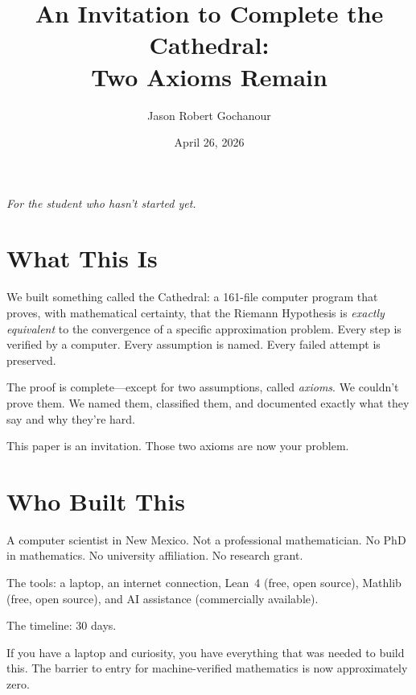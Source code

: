 \documentclass[11pt,a4paper]{article}
\title{%
  An Invitation to Complete the Cathedral:\\
  Two Axioms Remain%
}
\author{
  Jason Robert Gochanour
}
\date{April 26, 2026}
\begin{document}
\maketitle

\begin{center}
\emph{For the student who hasn't started yet.}
\end{center}

\vspace{1cm}

\section*{What This Is}

We built something called the Cathedral: a 161-file computer program
that proves, with mathematical certainty, that the Riemann Hypothesis
is \emph{exactly equivalent} to the convergence of a specific
approximation problem. Every step is verified by a computer. Every
assumption is named. Every failed attempt is preserved.

The proof is complete---except for two assumptions, called
\emph{axioms}. We couldn't prove them. We named them, classified
them, and documented exactly what they say and why they're hard.

This paper is an invitation. Those two axioms are now your problem.

\section*{Who Built This}

A computer scientist in New Mexico. Not a professional mathematician.
No PhD in mathematics. No university affiliation. No research grant.

The tools: a laptop, an internet connection, Lean~4 (free, open
source), Mathlib (free, open source), and AI assistance (commercially
available).

The timeline: 30 days.

If you have a laptop and curiosity, you have everything that was
needed to build this. The barrier to entry for machine-verified
mathematics is now approximately zero.

\end{document}
